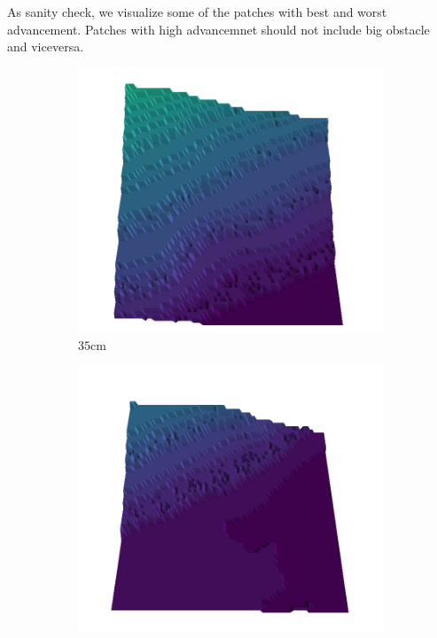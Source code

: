 \documentclass[../document.tex]{subfiles}
\begin{document}
As sanity check, we visualize some of the patches with best and worst advancement. Patches with high advancemnet should not include big obstacle and viceversa.
\begin{figure}[htbp]
    \centering
    \begin{subfigure}[b]{0.19\textwidth}
    \includegraphics[width=\linewidth]{../img/5/quarry/all/best/35-patch-3d-majavi-colormap-0.png}
    \caption{$35$cm}
    \end{subfigure}
    \begin{subfigure}[b]{0.19\textwidth}
    \includegraphics[width=\linewidth]{../img/5/quarry/all/best/38-patch-3d-majavi-colormap-1.png}

\end{subfigure}
\end{figure}
\end{document}
